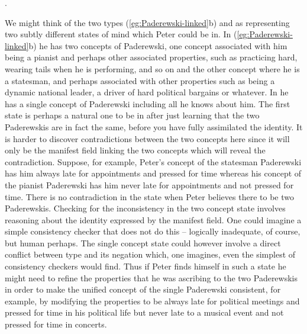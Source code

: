 \preveg{}.
\begin{ex} 
\end{ex} 
We might think of the two types (\ref{eg:Paderewski-linked}b) and \preveg{} as
representing two subtly different states of mind which Peter could be
in.  In (\ref{eg:Paderewski-linked}b) he has two concepts of Paderewski, one concept associated with him
being a pianist and perhaps other associated properties, such as
practicing hard, wearing tails when he is performing, and so on and
the other concept where he is a statesman, and perhaps associated with
other properties such as being a dynamic national leader, a driver of
hard political bargains or whatever.  In \preveg{} he has a
single concept of Paderewski including all he knows about him. The
first state is perhaps a natural one to be in after just learning that
the two Paderewskis are in fact the same, before you have fully
assimilated the identity.  It is harder to discover contradictions
between the two concepts here since it will only be the manifest field
linking the two concepts which will reveal the contradiction.
Suppose, for example, Peter's concept of the statesman Paderewski has
him always late for appointments and pressed for time whereas his
concept of the pianist Paderewski has him never late for appointments
and not pressed for time.  There is no contradiction in the state when
Peter believes there to be two Paderewskis.  Checking for the
inconsistency in the two concept state involves reasoning about the
identity expressed by the manifest field.  One could imagine a simple
consistency checker that does not do this -- logically inadequate, of
course, but human perhaps.  The single concept state could however
involve a direct conflict between type and its negation which, one
imagines, even the simplest of consistency checkers would find.  Thus
if Peter finds himself in such a state he might need to refine the
properties that he was ascribing to the two Paderewskis in order to
make the unified concept of the single Paderewski consistent, for
example, by modifying the properties to be always late for political
meetings and pressed for time in his political life but never late to
a musical event and not pressed for time in concerts.

